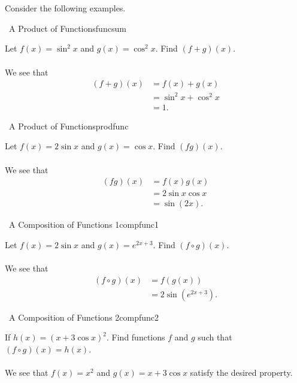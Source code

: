 		\vphantom
		\\
		\\
		Consider the following examples.
		\begin{example}{\Difficulty\,\Difficulty\,\,A Product of Functions}{funcsum}

			Let \(f(x)=\sin^2x\) and \(g(x)=\cos^2x\). Find \((f+g)(x)\).
			\\
			\\
			We see that
			\begin{align*}
				(f+g)(x)&=f(x)+g(x) \\
				&=\sin^2x+\cos^2x \\
				&=1.
			\end{align*}
		\end{example}
		\begin{example}{\Difficulty\,\Difficulty\,\,A Product of Functions}{prodfunc}

			Let \(f(x)=2\sin x\) and \(g(x)=\cos x\). Find \((fg)(x)\).
			\\
			\\
			We see that
			\begin{align*}
				(fg)(x)&=f(x)g(x) \\
				&=2\sin x\cos x \\
				&=\sin(2x).
			\end{align*}
		\end{example}
		\begin{example}{\Difficulty\,\Difficulty\,\,A Composition of Functions 1}{compfunc1}

			Let \(f(x)=2\sin x\) and \(g(x)=e^{2x+3}\). Find \((f\circ g)(x)\).
			\\
			\\
			We see that
			\begin{align*}
				(f\circ g)(x)&=f(g(x)) \\
				&=2\sin(e^{2x+3}).
			\end{align*}
		\end{example}
		\begin{example}{\Difficulty\,\Difficulty\,\,A Composition of Functions 2}{compfunc2}

			If \(h(x)=(x+3\cos x)^2\). Find functions \(f\) and \(g\) such that \((f\circ g)(x)=h(x)\).
			\\
			\\
			We see that \(f(x)=x^2\) and \(g(x)=x+3\cos x\) satisfy the desired property.

		\end{example}